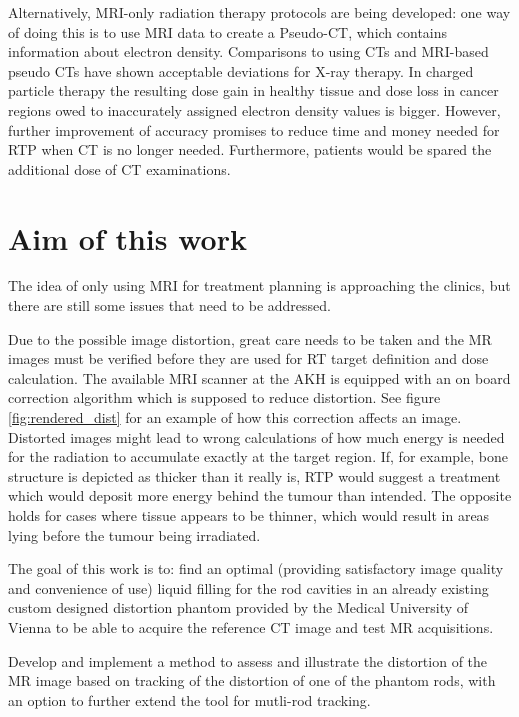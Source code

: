Alternatively, MRI-only radiation therapy protocols are being developed:
one way of doing this is to use MRI data to create a Pseudo-CT, which contains information about electron density.
Comparisons to using CTs and MRI-based pseudo CTs have shown acceptable deviations for X-ray therapy.
In charged particle therapy the resulting dose gain in healthy tissue and dose loss in cancer regions owed to inaccurately assigned electron density values is bigger.
However, further improvement of accuracy promises to reduce time and money needed for RTP when CT is no longer needed.
Furthermore, patients would be spared the additional dose of CT examinations.  \cite{Rank2013, Stanescu2006, Nyholm2015, Greer2015, Chen2004}


\section{Aim of this work}
The idea of only using MRI for treatment planning is approaching the clinics, but there are still some issues that need to be addressed.

Due to the possible image distortion, great care needs to be taken and the MR images must be verified before they are used for RT target definition and dose calculation.
The available MRI scanner at the AKH is equipped with an on board correction algorithm which is supposed to reduce distortion.
See figure \ref{fig:rendered_dist} for an example of how this correction affects an image.
Distorted images might lead to wrong calculations of how much energy is needed for the radiation to accumulate exactly at the target region.
If, for example, bone structure is depicted as thicker than it really is, RTP would suggest a treatment which would deposit more energy behind the tumour than intended.
The opposite holds for cases where tissue appears to be thinner, which would result in areas lying before the tumour being irradiated.

The goal of this work is to:
find an optimal (providing satisfactory image quality and convenience of use) liquid filling for the rod cavities in an already existing custom designed distortion phantom provided by the Medical University of Vienna to be able to acquire the reference CT image and test MR acquisitions.

Develop and implement a method to assess and illustrate the distortion of the MR image based on tracking of the distortion of one of the phantom rods, with an option to further extend the tool for mutli-rod tracking.

